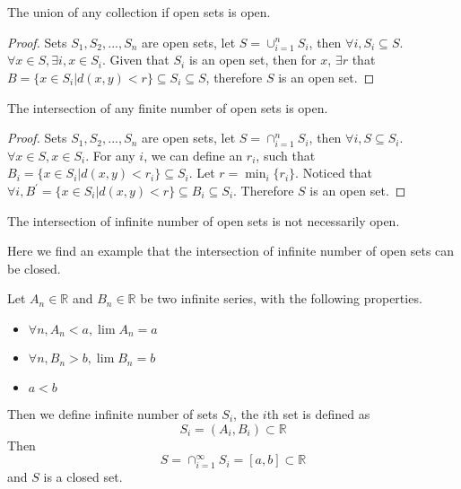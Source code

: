 			\begin{theorem}
				The union of any collection if open sets is open.
			\end{theorem}

			\begin{proof}
				Sets $S_1, S_2, ..., S_n$ are open sets, let $S = \cup_{i=1}^n S_i$, then $\forall i, S_i \subseteq S$. $\forall x\in S, \exists i, x\in S_i$. Given that $S_i$ is an open set, then for $x$, $\exists r$ that $B = \{x \in S_i | d(x, y) < r\} \subseteq S_i \subseteq S$, therefore $S$ is an open set.
			\end{proof}

			\begin{theorem}
				The intersection of any finite number of open sets is open.
			\end{theorem}

			\begin{proof}
				Sets $S_1, S_2, ..., S_n$ are open sets, let $S = \cap_{i=1}^n S_i$, then $\forall i, S \subseteq S_i$. $\forall x\in S, x\in S_i$. For any $i$, we can define an $r_i$, such that $B_i = \{x\in S_i|d(x, y) < r_i\} \subseteq S_i$. Let $r = \min_i\{r_i\}$. Noticed that $\forall i, B^\prime = \{x \in S_i|d(x, y) < r\} \subseteq B_i \subseteq S_i$. Therefore $S$ is an open set.
			\end{proof}

			\begin{remark}
				The intersection of infinite number of open sets is not necessarily open.
			\end{remark}

			Here we find an example that the intersection of infinite number of open sets can be closed.
			\begin{example}
				Let $A_n \in \mathbb{R}$ and $B_n \in \mathbb{R}$ be two infinite series, with the following properties.
				\begin{itemize}
					\item $\forall n, A_n < a, \lim A_n = a$
					\item $\forall n, B_n > b, \lim B_n = b$
					\item $a < b$
				\end{itemize}
				Then we define infinite number of sets $S_i$, the $i$th set is defined as
				\begin{equation}
					S_i = (A_i, B_i) \subset \mathbb{R}
				\end{equation}
				Then
				\begin{equation}
					S = \cap_{i=1}^\infty S_i = [a, b] \subset \mathbb{R}
				\end{equation}
				and $S$ is a closed set.
			\end{example}

